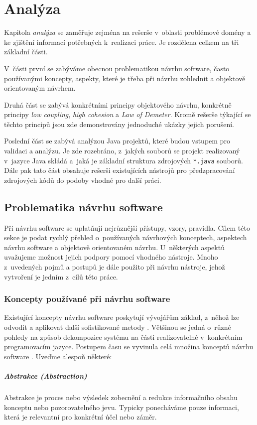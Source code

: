 \chapter{Analýza}
\label{analysis}
Kapitola \emph{analýza} se zaměřuje zejména na rešerše v~oblasti problémové domény a ke zjištění informací potřebných k~realizaci práce. Je rozdělena celkem na tři základní části.

V~části první se zabýváme obecnou problematikou návrhu software, často používanými koncepty, aspekty, které je třeba při návrhu zohlednit a objektově orientovaným návrhem.

Druhá část se zabývá konkrétními principy objektového návrhu, konkrétně principy \emph{low coupling}, \emph{high cohesion} a \emph{Law of Demeter}. Kromě rešerše týkající se těchto principů jsou zde demonstrovány jednoduché ukázky jejich porušení.

Poslední část se zabývá analýzou Java projektů, které budou vstupem pro validaci a analýzu. Je zde rozebráno, z~jakých souborů se projekt realizovaný v~jazyce Java skládá a~jaká je základní struktura zdrojových \verb+*.java+ souborů. Dále pak tato část obsahuje rešerši existujících nástrojů pro předzpracování zdrojových kódů do podoby vhodné pro další práci.
\section{Problematika návrhu software}
Při návrhu software se uplatňují nejrůznější přístupy, vzory, pravidla. Cílem této sekce je podat rychlý přehled o~používaných návrhových konceptech, aspektech návrhu software a objektově orientovaném návrhu. U~některých aspektů uvažujeme možnost jejich podpory pomocí vhodného nástroje. Mnoho z~uvedených pojmů a postupů je dále použito při návrhu nástroje, jehož vytvoření je jedním z~cílů této práce.

\subsection{Koncepty používané při návrhu software}
Existující koncepty návrhu software poskytují vývojářům základ, z~něhož lze odvodit a aplikovat další sofistikované metody \cite{wiki:software_design}. Většinou se jedná o~různé pohledy na způsob dekompozice systému na části realizovatelné v~konkrétním programovacím jazyce. Postupem času se vyvinula celá množina konceptů návrhu software \cite{swengineeringconcepts}. Uveďme alespoň některé:

\paragraph{Abstrakce (Abstraction)} Abstrakce je proces nebo výsledek zobecnění a redukce informačního obsahu konceptu nebo pozorovatelného jevu. Typicky ponecháváme pouze \mbox{informaci}, která je relevantní pro konkrétní účel nebo záměr.

